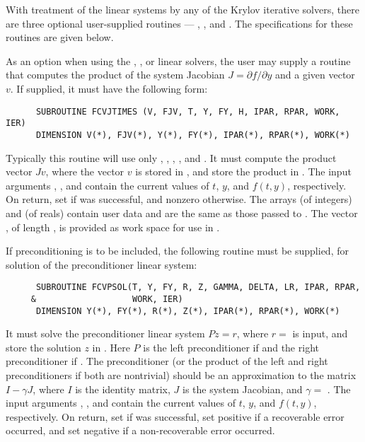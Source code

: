 \begin{Steps}
  With treatment of the linear systems by any of the Krylov iterative
  solvers, there are three optional user-supplied routines ---
  , , and .  The specifications
  for these routines are given below.

  As an option when using the {\spgmr}, {\spbcg}, or {\sptfqmr}  linear solvers, 
  the user may supply a routine that computes the product of the system Jacobian 
  $J = \partial f / \partial y$ 
  and a given vector $v$.  If supplied, it must have the following form:
\begin{verbatim}
      SUBROUTINE FCVJTIMES (V, FJV, T, Y, FY, H, IPAR, RPAR, WORK, IER)
      DIMENSION V(*), FJV(*), Y(*), FY(*), IPAR(*), RPAR(*), WORK(*)
\end{verbatim}
  Typically this routine will use only , , , , and
  .  It must compute the product vector $Jv$, where the vector $v$ is
  stored in , and store the product in .  
  The input arguments , , and  contain the current
  values of $t$, $y$, and $f(t,y)$, respectively.  On return, set
   if  was successful, and nonzero otherwise.
  The arrays  (of integers) and  (of reals) contain user data
  and are the same as those passed to .
  The vector , of length , is
  provided as work space for use in .

  If preconditioning is to be included, the following routine must be
  supplied, for solution of the preconditioner linear system:
\begin{verbatim}
      SUBROUTINE FCVPSOL(T, Y, FY, R, Z, GAMMA, DELTA, LR, IPAR, RPAR,
     &                   WORK, IER)
      DIMENSION Y(*), FY(*), R(*), Z(*), IPAR(*), RPAR(*), WORK(*)
\end{verbatim}
  It must solve the preconditioner linear system $Pz = r$, where $r =$  
  is input, and store the solution $z$ in . Here $P$ is the left 
  preconditioner if  and the right preconditioner if .  
  The preconditioner (or the product of the left and right preconditioners 
  if both are nontrivial) should be an  approximation to the matrix 
  $I - \gamma J$, where $I$ is the identity matrix, $J$ is the system Jacobian,
  and $\gamma =$ .
  The input arguments , , and  contain the current
  values of $t$, $y$, and $f(t,y)$, respectively.
  On return, set  if  was successful, set 
  positive if a recoverable error occurred, and set  negative if a 
  non-recoverable error occurred.


\end{Steps}
